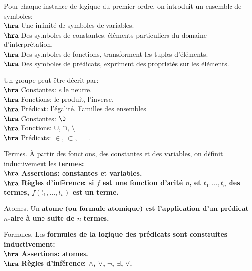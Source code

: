 \documentclass[french, 11pt]{article}
\begin{document}
\begin{defi}{}{}
    Pour chaque instance de logique du premier ordre, on introduit un ensemble de symboles:\\
    $\hra$ Une infinité de symboles de variables.\\
    $\hra$ Des symboles de constantes, éléments particuliers du domaine d'interprétation.\\
    $\hra$ Des symboles de fonctions, transforment les tuples d'éléments.\\
    $\hra$ Des symboles de prédicats, expriment des propriétés sur les éléments.
\end{defi}

\vspace*{-0.8cm}

\begin{ex}{}{}
    Un groupe peut être décrit par:\\
    $\hra$ Constantes: $e$ le neutre.\\
    $\hra$ Fonctions: le produit, l'inverse.\\ 
    $\hra$ Prédicat: l'égalité.\n
    Familles des ensembles:\\
    $\hra$ Constantes: $\0$\\
    $\hra$ Fonctions: $\cup$, $\cap$, $\setminus$\\
    $\hra$ Prédicats: $\in$, $\subset$, $=$.
\end{ex}

\vspace*{-0.8cm}

\begin{defi}{Termes.}{}
    À partir des fonctions, des constantes et des variables, on définit inductivement les \bf{termes}:\\
    $\hra$ Assertions:  constantes et variables.\\
    $\hra$ Règles d'inférence: si $f$ est une fonction d'arité $n$, et $t_1,...,t_n$ des termes, $f(t_1,...,t_n)$ est un terme.
\end{defi}

\vspace*{-0.8cm}

\begin{defi}{Atomes.}{}
    Un \bf{atome} (ou formule atomique) est l'application d'un prédicat $n$-aire à une suite de $n$ termes.
\end{defi}

\vspace*{-0.8cm}

\begin{defi}{Formules.}{}
    Les \bf{formules} de la logique des prédicats sont construites inductivement:\\
    $\hra$ Assertions: atomes.\\
    $\hra$ Règles d'inférence: $\land$, $\lor$, $\lnot$, $\exists$, $\forall$.
\end{defi}
\end{document}
